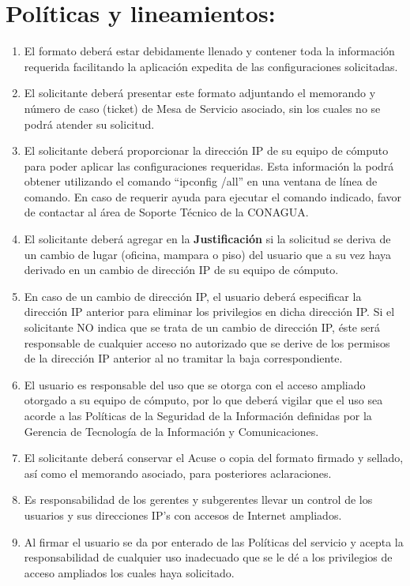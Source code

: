 \documentclass[letterpaper,9pt]{article}
\begin{document}
\clearpage
\section*{Políticas y lineamientos:}
{\small \begin{enumerate}
	\item 	El formato deberá estar debidamente llenado y contener toda la información requerida facilitando la aplicación expedita de las configuraciones solicitadas.
	\item 	El solicitante deberá presentar este formato adjuntando el memorando y número de caso (ticket) de Mesa de Servicio asociado, sin los cuales no se podrá atender su solicitud.         
	\item  	El solicitante deberá proporcionar la dirección IP de su equipo de cómputo para poder aplicar las configuraciones requeridas. Esta información la podrá obtener utilizando el comando “ipconfig /all” en una ventana de línea de comando. En caso de requerir ayuda para ejecutar el comando indicado, favor de contactar al área de Soporte Técnico de la CONAGUA.
	\item 	El solicitante deberá agregar en la \textbf {Justificación} si la solicitud se deriva de un cambio de lugar (oficina, mampara o piso) del usuario que a su vez haya derivado en un cambio de dirección IP de su equipo de cómputo.
	\item  	En caso de un cambio de dirección IP, el usuario deberá especificar la dirección IP anterior para eliminar los privilegios en dicha dirección IP. Si el solicitante NO indica que se trata de un cambio de dirección IP, éste será responsable de cualquier acceso no autorizado que se derive de los permisos de la dirección IP anterior al no tramitar la baja correspondiente.
	\item 	El usuario es responsable del uso que se otorga con el acceso ampliado otorgado a su equipo de cómputo, por lo que deberá vigilar que el uso sea acorde a las Políticas de la Seguridad de la Información definidas por la Gerencia de Tecnología de la Información y Comunicaciones.
	\item 	El solicitante deberá conservar el Acuse o copia del formato firmado y sellado, así como el memorando asociado, para posteriores aclaraciones.
	\item  	Es responsabilidad de los gerentes y subgerentes llevar un control de los usuarios y sus direcciones IP’s con accesos de Internet ampliados.
	\item 	Al firmar el usuario se da por enterado de las Políticas del servicio y acepta la responsabilidad de cualquier uso inadecuado que se le dé a los privilegios de acceso ampliados los cuales haya solicitado.

\end{enumerate}}
\end{document}
